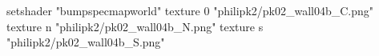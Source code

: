 setshader "bumpspecmapworld"
    texture 0 "philipk2/pk02_wall04b_C.png"
    texture n "philipk2/pk02_wall04b_N.png"
    texture s "philipk2/pk02_wall04b_S.png"